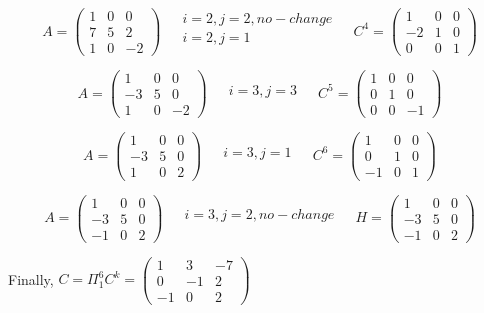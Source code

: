 \begin{example}
\[
A= \left(\begin{matrix}
	1 & 0 & 0 \\
	7 & 5 & 2 \\
	1 & 0 & -2
\end{matrix}\right) \;\;\;\;
\begin{matrix}
	i=2, j=2, no-change\\
	i=2, j = 1 \\
\end{matrix}  \;\;\;\;
C^4= \left(\begin{matrix}
	1 & 0 & 0 \\
	-2 & 1 & 0 \\
	0 & 0 & 1
\end{matrix}\right)
\]

\[
A= \left(\begin{matrix}
	1 & 0 & 0 \\
	-3 & 5 & 0 \\
	1 & 0 & -2
\end{matrix}\right) \;\;\;\;
\begin{matrix}
	i=3, j=3 \\
\end{matrix}  \;\;\;\;
C^5= \left(\begin{matrix}
	1 & 0 & 0 \\
	0 & 1 & 0 \\
	0 & 0 & -1
\end{matrix}\right)
\]


\[
A= \left(\begin{matrix}
	1 & 0 & 0 \\
	-3 & 5 & 0 \\
	1 & 0 & 2
\end{matrix}\right) \;\;\;\;
\begin{matrix}
	i=3, j=1 \\
\end{matrix}  \;\;\;\;
C^6= \left(\begin{matrix}
	1 & 0 & 0 \\
	0 & 1 & 0 \\
	-1 & 0 & 1
\end{matrix}\right)
\]


\[
A= \left(\begin{matrix}
	1 & 0 & 0 \\
	-3 & 5 & 0 \\
	-1 & 0 & 2
\end{matrix}\right) \;\;\;\;
\begin{matrix}
	i=3, j=2, no-change \\
\end{matrix}  \;\;\;\;
H= \left(\begin{matrix}
	1 & 0 & 0 \\
	-3 & 5 & 0 \\
	-1 & 0 & 2
\end{matrix}\right)
\]

Finally, $C = \Pi_1^6 C^k = \left(\begin{matrix}
		1 & 3 & -7 \\
		0 & -1 & 2 \\
		-1 & 0 & 2
\end{matrix}\right)
$
\end{example}

